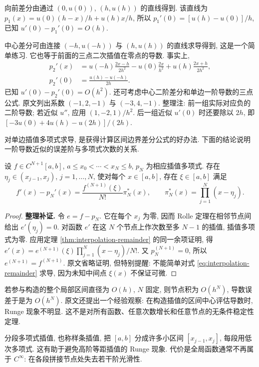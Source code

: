 向前差分由通过 $(0,u(0))$, $(h,u(h))$ 的直线得到. 该直线为 $p_1(x)=u(0)(h-x)/h+u(h)x/h$, 所以 $p_1'(0)=[u(h)-u(0)]/h$, 已知 $u'(0)-p_1'(0)=O(h)$.

中心差分可由连接 $(-h,u(-h))$ 与 $(h,u(h))$ 的直线求导得到, 这是一个简单练习. 它也等于前面的三点二次插值在零点的导数. 事实上,
\begin{align*}
p_2'(x)&=u(-h)\frac{2x-h}{2h^2}-u(0)\frac{2x}{h^2}+u(h)\frac{2x+h}{2h^2},\\
p_2'(0)&=\frac{u(h)-u(-h)}{2h}.
\end{align*}
已知 $u'(0)-p_2'(0)=O(h^2)$. 还可考虑中心二阶差分和单边一阶导数的三点公式. 原文列出系数 $(-1,2,-1)$ 与 $(-3,4,-1)$. 整理注: 前一组实际对应负的二阶导数; 若近似 $u''$, 应用 $(1,-2,1)/h^2$. 后一组近似 $u'(0)$ 时还要除以 $2h$, 即 $[-3u(0)+4u(h)-u(2h)]/(2h)$.

对单边插值多项式求导, 是获得计算区间边界差分公式的好办法. 下面的结论说明一阶导数近似的误差阶与多项式次数的关系.

\begin{theorem}\label{thm:derivative-interpolation-error}
设 $f\in C^{N+1}[a,b]$, $a\leq x_0<\cdots<x_N\leq b$, $p_N$ 为相应插值多项式. 存在 $\eta_j\in(x_{j-1},x_j)$, $j=1,\ldots,N$, 使对每个 $x\in[a,b]$, 存在 $\xi\in[a,b]$ 满足
\[
f'(x)-p_N'(x)=\frac{f^{(N+1)}(\xi)}{N!}\pi_N^*(x),\qquad
\pi_N^*(x)=\prod_{j=1}^{N}(x-\eta_j).
\]
\end{theorem}
\begin{proof}
\textbf{整理补证.} 令 $e=f-p_N$. 它在每个 $x_j$ 为零, 因而 Rolle 定理在相邻节点间给出 $e'(\eta_j)=0$. 对函数 $e'$ 在这 $N$ 个节点上作次数至多 $N-1$ 的插值, 插值多项式为零. 应用定理 \ref{thm:interpolation-remainder} 的同一余项证明, 得
$e'(x)=e^{(N+1)}(\xi)\prod_{j=1}^{N}(x-\eta_j)/N!$. 又 $p_N^{(N+1)}=0$, 所以 $e^{(N+1)}=f^{(N+1)}$. 原文省略证明, 但特别提醒: 不能简单对式 \eqref{eq:interpolation-remainder} 求导, 因为未知中间点 $\xi(x)$ 不保证可微.
\end{proof}

若参与构造的整个局部区间直径为 $O(h)$, $N$ 固定, 则节点积为 $O(h^N)$, 导数误差于是为 $O(h^N)$. 原文还提出一个经验观察: 在构造插值的区间中心评估导数时, Runge 现象不明显. 这不是对所有函数、任意次数增长和任意节点的无条件稳定性定理.


分段多项式插值, 也称样条插值, 把 $[a,b]$ 分成许多小区间 $[x_{j-1},x_j]$, 每段用低次多项式. 这有助于避免高阶等距插值的 Runge 现象. 代价是全局函数通常不再属于 $C^\infty$: 在各段拼接节点处失去若干阶光滑性.


